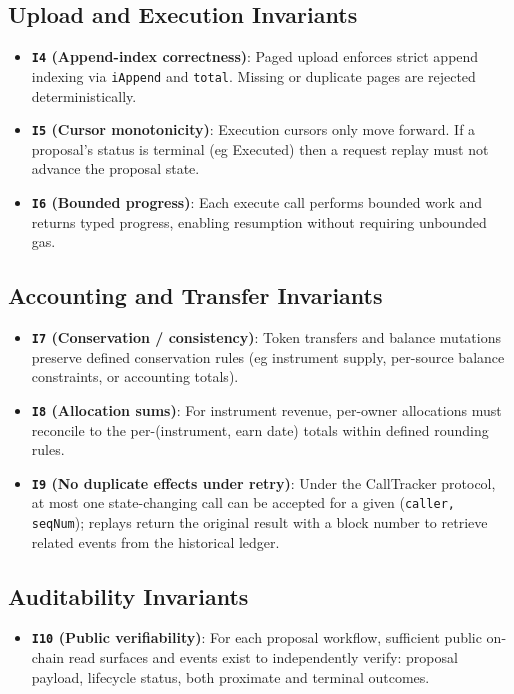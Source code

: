 \documentclass[10pt]{article}
\begin{document}
\subsection{Upload and Execution Invariants}
\begin{itemize}
    \item \textbf{\texttt{I4} (Append-index correctness)}: Paged upload enforces strict append indexing via \texttt{iAppend} and \texttt{total}. Missing or duplicate pages are rejected deterministically.

    \item \textbf{\texttt{I5} (Cursor monotonicity)}: Execution cursors only move forward. If a proposal's status is terminal (eg Executed) then a request replay must not advance the proposal state.

    \item \textbf{\texttt{I6} (Bounded progress)}: Each execute call performs bounded work and returns typed progress, enabling resumption without requiring unbounded gas.
\end{itemize}

\subsection{Accounting and Transfer Invariants}
\begin{itemize}
    \item \textbf{\texttt{I7} (Conservation / consistency)}: Token transfers and balance mutations preserve defined conservation rules (eg instrument supply, per-source balance constraints, or accounting totals).

    \item \textbf{\texttt{I8} (Allocation sums)}: For instrument revenue, per-owner allocations must reconcile to the per-(instrument, earn date) totals within defined rounding rules.

    \item \textbf{\texttt{I9} (No duplicate effects under retry)}: Under the CallTracker protocol, at most one state-changing call can be accepted for a given (\texttt{caller, seqNum}); replays return the original result with a block number to retrieve related events from the historical ledger.
\end{itemize}

\subsection{Auditability Invariants}
\begin{itemize}
    \item \textbf{\texttt{I10} (Public verifiability)}: For each proposal workflow, sufficient public on-chain read surfaces and events exist to independently verify: proposal payload, lifecycle status, both proximate and terminal outcomes.
\end{itemize}
\end{document}
